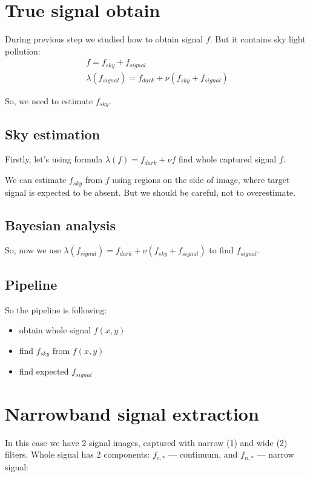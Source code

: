 \documentclass{article}
\begin{document}
\section{True signal obtain}

During previous step we studied how to obtain signal $f$. But it contains sky light pollution:
\begin{eqnarray}
    f = f_{sky} + f_{signal} \\
    \lambda(f_{signal}) = f_{dark} + \nu \left( f_{sky} + f_{signal} \right)
\end{eqnarray}

So, we need to estimate $f_{sky}$.

\subsection{Sky estimation}
Firstly, let's using formula $\lambda(f) = f_{dark} + \nu f$ find whole captured signal $f$.

We can estimate $f_{sky}$ from $f$ using regions on the side of image, where target signal is expected to be absent.
But we should be careful, not to overestimate.

\subsection{Bayesian analysis}

So, now we use $\lambda(f_{signal}) = f_{dark} + \nu \left( f_{sky} + f_{signal} \right)$ to find $f_{signal}$.

\subsection{Pipeline}
So the pipeline is following:

\begin{itemize}
    \item obtain whole signal $f(x,y)$
    \item find $f_{sky}$ from $f(x,y)$
    \item find expected $f_{signal}$
\end{itemize}

\section{Narrowband signal extraction}

In this case we have 2 signal images, captured with narrow (1) and wide (2) filters. Whole signal has 2 components: $f_{c,*}$ --- continuum,
and $f_{n,*}$ --- narrow signal:
\end{document}
